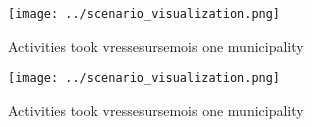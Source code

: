\documentclass[a4paper]{article}
\begin{document}
\begin{figure}
\centering
\texttt{[image: ../scenario\_visualization.png]}
\caption{Activities took vressesursemois one municipality 
}
\end{figure}
 
\begin{figure}
\centering
\texttt{[image: ../scenario\_visualization.png]}
\caption{Activities took vressesursemois one municipality 
}
\end{figure}
 
\end{document}
